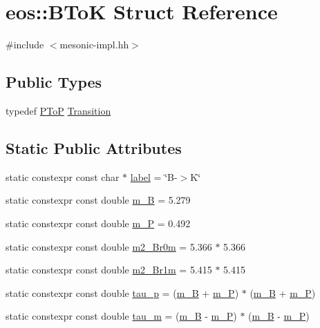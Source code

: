 \hypertarget{structeos_1_1BToK}{
\section{eos::BToK Struct Reference}
\label{structeos_1_1BToK}
}


{\ttfamily \#include $<$mesonic-\/impl.hh$>$}\subsection*{Public Types}
\begin{DoxyCompactItemize}
\item 
typedef \hyperlink{structeos_1_1PToP}{PToP} \hyperlink{structeos_1_1BToK_aa1054f94316f9922fcefffb60a198b38}{Transition}
\end{DoxyCompactItemize}
\subsection*{Static Public Attributes}
\begin{DoxyCompactItemize}
\item 
static constexpr const char $\ast$ \hyperlink{structeos_1_1BToK_ab29ff334c290b4b8dde7b143bb07e89a}{label} = \char`\"{}B-\/$>$K\char`\"{}
\item 
static constexpr const double \hyperlink{structeos_1_1BToK_afd952438871e130473abfe28556b6287}{m\_\-B} = 5.279
\item 
static constexpr const double \hyperlink{structeos_1_1BToK_aed69f6a47bf87622584136fd30a2c4ec}{m\_\-P} = 0.492
\item 
static constexpr const double \hyperlink{structeos_1_1BToK_a0cf40cde07f2b324f047a90ca3754899}{m2\_\-Br0m} = 5.366 $\ast$ 5.366
\item 
static constexpr const double \hyperlink{structeos_1_1BToK_ac78a6940a67216f7ef20e348776e850c}{m2\_\-Br1m} = 5.415 $\ast$ 5.415
\item 
static constexpr const double \hyperlink{structeos_1_1BToK_a3f1976d7598992bd31888637a55a6cf4}{tau\_\-p} = (\hyperlink{structeos_1_1BToK_afd952438871e130473abfe28556b6287}{m\_\-B} + \hyperlink{structeos_1_1BToK_aed69f6a47bf87622584136fd30a2c4ec}{m\_\-P}) $\ast$ (\hyperlink{structeos_1_1BToK_afd952438871e130473abfe28556b6287}{m\_\-B} + \hyperlink{structeos_1_1BToK_aed69f6a47bf87622584136fd30a2c4ec}{m\_\-P})
\item 
static constexpr const double \hyperlink{structeos_1_1BToK_a1e903e338534718baea7cf0f62cb4355}{tau\_\-m} = (\hyperlink{structeos_1_1BToK_afd952438871e130473abfe28556b6287}{m\_\-B} -\/ \hyperlink{structeos_1_1BToK_aed69f6a47bf87622584136fd30a2c4ec}{m\_\-P}) $\ast$ (\hyperlink{structeos_1_1BToK_afd952438871e130473abfe28556b6287}{m\_\-B} -\/ \hyperlink{structeos_1_1BToK_aed69f6a47bf87622584136fd30a2c4ec}{m\_\-P})
\end{DoxyCompactItemize}


